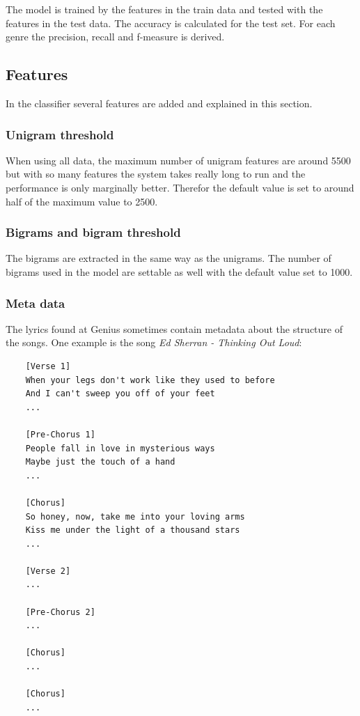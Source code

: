 \documentclass[a4paper, 12pt]{article}
\begin{document}
The model is trained by the features in the train data and tested with the features in the test data.
The accuracy is calculated for the test set.
For each genre the precision, recall and f-measure is derived.

\subsection{Features}
In the classifier several features are added and explained in this section.

\subsubsection*{Unigram threshold}
When using all data, the maximum number of unigram features are around 5500 but with so many features the system takes really long to run and the performance is only marginally better.
Therefor the default value is set to around half of the maximum value to 2500.

\subsubsection*{Bigrams and bigram threshold}
The bigrams are extracted in the same way as the unigrams.
The number of bigrams used in the model are settable as well with the default value set to 1000.

\subsubsection*{Meta data}
The lyrics found at Genius sometimes contain metadata about the structure of the songs.
One example is the song \textit{Ed Sherran - Thinking Out Loud}:

\begin{verbatim}
    [Verse 1]
    When your legs don't work like they used to before
    And I can't sweep you off of your feet
    ...

    [Pre-Chorus 1]
    People fall in love in mysterious ways
    Maybe just the touch of a hand
    ...

    [Chorus]
    So honey, now, take me into your loving arms
    Kiss me under the light of a thousand stars
    ...

    [Verse 2]
    ...

    [Pre-Chorus 2]
    ...

    [Chorus]
    ...

    [Chorus]
    ...

\end{verbatim}
\end{document}
